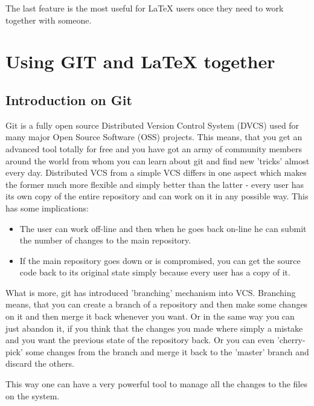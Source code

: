 \documentclass[
    draft
]{scrartcl}
\begin{document}
%
The last feature is the most useful for \LaTeX{} users once they need to work
    together with someone.

\section{Using GIT and \LaTeX{} together}

\subsection{Introduction on Git}

Git is a fully open source Distributed Version Control System (DVCS) used for
    many major Open Source Software (OSS) projects.
%
This means, that you get an advanced tool totally for free and you have got an
    army of community members around the world from whom you can learn about git
    and find new 'tricks' almost every day.
%
Distributed VCS from a simple VCS differs in one aspect which makes the former
    much more flexible and simply better than the latter - every user has its
    own copy of the entire repository and can work on it in any possible way.
%
This has some implications:
\begin{itemize}
    \item The user can work off-line and then when he goes back on-line he can
        submit the number of changes to the main repository.
    \item If the main repository goes down or is compromised, you can get the
        source code back to its original state simply because every user has a
        copy of it.
\end{itemize}


%
What is more, git has introduced 'branching' mechanism into VCS.
%
Branching means, that you can create a branch of a repository and then make some
    changes on it and then merge it back whenever you want.
%
Or in the same way you can just abandon it, if you think that the changes you
    made where simply a mistake and you want the previous state of the
    repository back.
%
Or you can even 'cherry-pick' some changes from the branch and merge it back to
    the 'master' branch and discard the others.



This way one can have a very powerful tool to manage all the changes to the
    files on the system.
\end{document}
